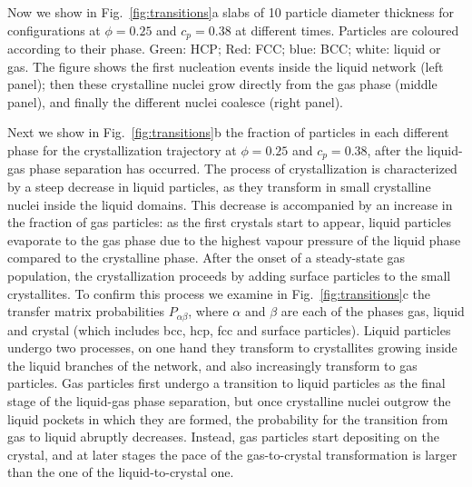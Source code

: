 \documentclass[twocolumn,superscriptaddress,showpacs,preprintnumbers,
amsmath,amssymb,prl]{revtex4-1}
\begin{document}
Now we show in Fig.~\ref{fig:transitions}a slabs of 10 particle diameter thickness for configurations at $\phi=0.25$ and $c_p=0.38$ at different times.
Particles are coloured according to their phase. Green: HCP; Red: FCC; blue: BCC; white: liquid or gas. The figure shows the first nucleation
events inside the liquid network (left panel); then these crystalline nuclei grow directly from the gas phase (middle panel), and finally
the different nuclei coalesce (right panel). 

Next we show in Fig.~\ref{fig:transitions}b the fraction of particles in each different phase for the crystallization trajectory at
$\phi=0.25$ and $c_p=0.38$, after the liquid-gas phase separation has occurred. The process of crystallization is characterized
by a steep decrease in liquid particles, as they transform in small crystalline nuclei inside the liquid domains. This decrease
is accompanied by an increase in the fraction of gas particles: as the first crystals start to appear, liquid particles evaporate
to the gas phase due to the highest vapour pressure of the liquid phase compared to the crystalline phase. After the onset
of a steady-state gas population, the crystallization proceeds by adding surface particles to the small crystallites. To confirm this process we
examine in Fig.~\ref{fig:transitions}c the transfer matrix probabilities $P_{\alpha\beta}$, where $\alpha$ and $\beta$ are each of the
phases gas, liquid and crystal (which includes bcc, hcp, fcc and surface particles). Liquid particles undergo two processes, on one
hand they transform to crystallites growing inside the liquid branches of the network, and also increasingly transform to gas particles.
Gas particles first undergo a transition to liquid particles as the final stage of the liquid-gas phase separation, but once
crystalline nuclei outgrow the liquid pockets in which they are formed, the probability for the transition from gas to liquid
abruptly decreases. Instead, gas particles start depositing on the crystal, and at later stages the pace of the gas-to-crystal transformation
is larger than the one of the liquid-to-crystal one.
\end{document}
